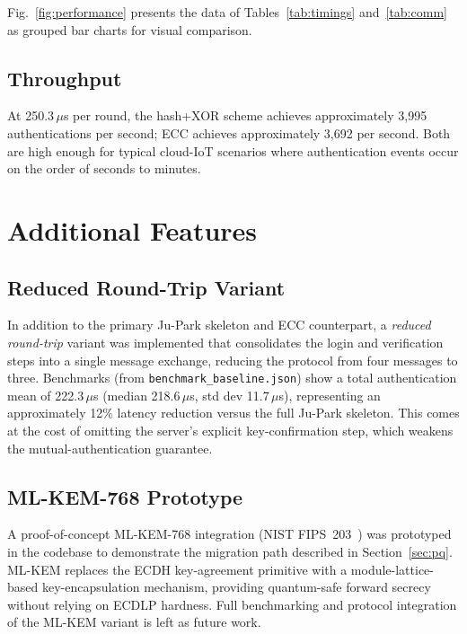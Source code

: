 \documentclass[journal]{IEEEtran}
\begin{document}
Fig.~\ref{fig:performance} presents the data of Tables~\ref{tab:timings}
and~\ref{tab:comm} as grouped bar charts for visual comparison.



\subsection{Throughput}

At 250.3\,$\mu$s per round, the hash+XOR scheme achieves approximately
3,995 authentications per second; ECC achieves approximately 3,692 per
second. Both are high enough for typical cloud-IoT scenarios where
authentication events occur on the order of seconds to minutes.

\section{Additional Features}
\label{sec:additional}

\subsection{Reduced Round-Trip Variant}

In addition to the primary Ju-Park skeleton and ECC counterpart, a
\emph{reduced round-trip} variant was implemented that consolidates the
login and verification steps into a single message exchange, reducing the
protocol from four messages to three. Benchmarks (from
\texttt{benchmark\_baseline.json}) show a total authentication mean of
222.3\,$\mu$s (median 218.6\,$\mu$s, std dev 11.7\,$\mu$s), representing an
approximately 12\% latency reduction versus the full Ju-Park skeleton. This
comes at the cost of omitting the server's explicit key-confirmation step,
which weakens the mutual-authentication guarantee.

\subsection{ML-KEM-768 Prototype}

A proof-of-concept ML-KEM-768 integration (NIST FIPS~203~\cite{NISTFIPS203})
was prototyped in the codebase to demonstrate the migration path described in
Section~\ref{sec:pq}. ML-KEM replaces the ECDH key-agreement primitive with a
module-lattice-based key-encapsulation mechanism, providing quantum-safe
forward secrecy without relying on ECDLP hardness. Full benchmarking and
protocol integration of the ML-KEM variant is left as future work.
\end{document}
